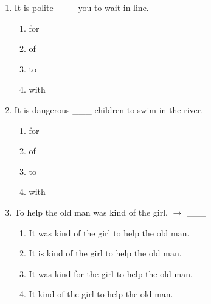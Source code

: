 \documentclass[11pt,a4paper]{ctexart}
\begin{document}
\begin{enumerate}[leftmargin=*,itemsep=4pt]
\begin{enumerate}[label=\Alph*.,leftmargin=2em,itemsep=1pt,topsep=2pt]
\item It is important for us to protect the environment.
\item It is important of us to protect the environment.
\item It is important for us protect the environment.
\item It important for us to protect the environment.
\end{enumerate}
\item It is polite \_\_\_ you to wait in line.
\begin{enumerate}[label=\Alph*.,leftmargin=2em,itemsep=1pt,topsep=2pt]
\item for
\item of
\item to
\item with
\end{enumerate}
\item It is dangerous \_\_\_ children to swim in the river.
\begin{enumerate}[label=\Alph*.,leftmargin=2em,itemsep=1pt,topsep=2pt]
\item for
\item of
\item to
\item with
\end{enumerate}
\item To help the old man was kind of the girl. $\rightarrow$ \_\_\_
\begin{enumerate}[label=\Alph*.,leftmargin=2em,itemsep=1pt,topsep=2pt]
\item It was kind of the girl to help the old man.
\item It is kind of the girl to help the old man.
\item It was kind for the girl to help the old man.
\item It kind of the girl to help the old man.
\end{enumerate}
\end{enumerate}

\newpage
\end{document}
